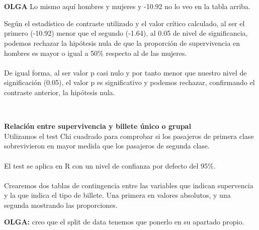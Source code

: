 \documentclass[
]{article}
\begin{document}
\begin{table}
\centering
{}
\end{table}

\texttt{}\\
\texttt{}~\\
\textbf{OLGA} Lo mismo aquí hombres y mujeres y -10.92 no lo veo en la
tabla arriba.

Según el estadístico de contraste utilizado y el valor crítico
calculado, al ser el primero (-10.92) menor que el segundo (-1.64), al
0.05 de nivel de significancia, podemos rechazar la hipótesis nula de
que la proporción de supervivencia en hombres es mayor o igual a 50\%
respecto al de las mujeres.\\
\texttt{}~\\
De igual forma, al ser valor p casi nulo y por tanto menor que nuestro
nivel de significación (0.05), el valor p es significativo y podemos
rechazar, confirmando el contraste anterior, la hipótesis nula.

\texttt{}\\
\texttt{}

\textbf{Relación entre supervivencia y billete único o grupal}
\texttt{}\\
Utilizamos el test Chi cuadrado para comprobar si los pasajeros de
primera clase sobrevivieron en mayor medida que los pasajeros de segunda
clase.\\
\texttt{}~\\
El test se aplica en R con un nivel de confianza por defecto del 95\%.\\
\texttt{}~\\
Crearemos dos tablas de contingencia entre las variables que indican
supervencia y la que indica el tipo de billete. Una primera en valores
absolutos, y una segunda mostrando las proporciones. \texttt{}

\textbf{OLGA:} creo que el split de data tenemos que ponerlo en su
apartado propio.
\end{document}
